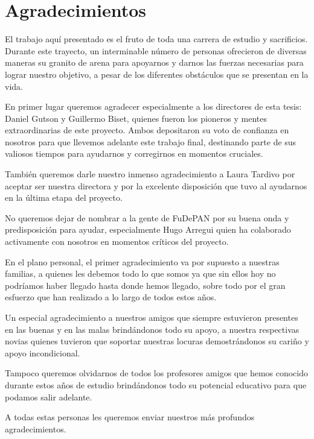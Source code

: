 \chapter*{Agradecimientos}
\label{chapter:agradecimientos}

El trabajo aquí presentado es el fruto de toda una carrera de estudio y sacrificios. Durante este trayecto, un interminable número de personas ofrecieron de diversas maneras su granito de arena para apoyarnos y darnos las fuerzas necesarias para lograr nuestro objetivo, a pesar de los diferentes obstáculos que se presentan en la vida.

En primer lugar queremos agradecer especialmente a los directores de esta tesis: Daniel Gutson y Guillermo Biset, quienes fueron los pioneros y mentes extraordinarias de este proyecto. Ambos depositaron su voto de confianza en nosotros para que llevemos adelante este trabajo final, destinando parte de sus valiosos tiempos para ayudarnos y corregirnos en momentos cruciales.

También queremos darle nuestro inmenso agradecimiento a Laura Tardivo por aceptar ser nuestra directora y por la excelente disposición que tuvo al ayudarnos en la última etapa del proyecto.

No queremos dejar de nombrar a la gente de FuDePAN por su buena onda y predisposición para ayudar, especialmente Hugo Arregui quien ha colaborado activamente con nosotros en momentos críticos del proyecto.

En el plano personal, el primer agradecimiento va por supuesto a nuestras familias, a quienes les debemos todo lo que somos ya que sin ellos hoy no podríamos haber llegado hasta donde hemos llegado, sobre todo por el gran esfuerzo que han realizado a lo largo de todos estos años.

Un especial agradecimiento a nuestros amigos que siempre estuvieron presentes en las buenas y en las malas brindándonos todo su apoyo, a nuestra respectivas novias quienes tuvieron que soportar nuestras locuras demostrándonos su cariño y apoyo incondicional.

Tampoco queremos olvidarnos de todos los profesores amigos que hemos conocido durante estos años de estudio brindándonos todo su potencial educativo para que podamos salir adelante.

A todas estas personas les queremos enviar nuestros más profundos \linebreak agradecimientos.


